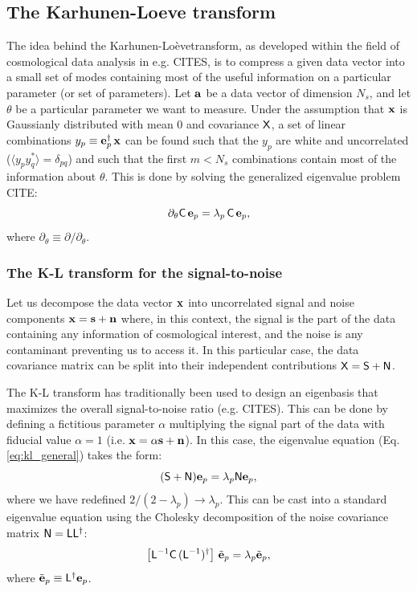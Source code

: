\documentclass[twocolumn,amsfont,amssymb,amsmath, showpacs,balancelastpage, nofootinbib]{revtex4-1}
\newcommand{\kalo}{Karhunen-Lo\`{e}ve}
\begin{document}
  \subsection{The Karhunen-Loeve transform}\label{ssec:method.klbasis}
    The idea behind the \kalo transform, as developed within the field of cosmological data analysis in e.g. CITES, is to compress a given data vector into a small set of modes containing most of the useful information on a particular parameter (or set of parameters). Let ${\bf a}$ be a data vector of dimension $N_s$, and let $\theta$ be a particular parameter we want to measure. Under the assumption that ${\bf x}$ is Gaussianly distributed with mean 0 and covariance ${\sf X}$, a set of linear combinations $y_p\equiv{\bf e}_p^\dag\,{\bf x}$ can be found such that the $y_p$ are white and uncorrelated ($\langle y_py_q^*\rangle=\delta_{pq}$) and such that the first $m<N_s$ combinations contain most of the information about $\theta$. This is done by solving the generalized eigenvalue problem CITE:
    \begin{equation}\label{eq:kl_general}
      \partial_\theta{\sf C}\,{\bf e}_p=\lambda_p\,{\sf C}\,{\bf e}_p,
    \end{equation}
    where $\partial_\theta\equiv\partial/\partial_\theta$.
    
    \subsubsection{The K-L transform for the signal-to-noise}\label{sssec:method.klbasis.sn}
      Let us decompose the data vector ${\bf x}$ into uncorrelated signal and noise components ${\bf x}={\bf s}+{\bf n}$ where, in this context, the signal is the part of the data containing any information of cosmological interest, and the noise is any contaminant preventing us to access it. In this particular case, the data covariance matrix can be split into their independent contributions ${\sf X}={\sf S}+{\sf N}$.
      
      The K-L transform has traditionally been used to design an eigenbasis that maximizes the overall signal-to-noise ratio (e.g. CITES). This can be done by defining a fictitious parameter $\alpha$ multiplying the signal part of the data with fiducial value $\alpha=1$ (i.e. ${\bf x}=\alpha{\bf s}+{\bf n}$). In this case, the eigenvalue equation (Eq. \ref{eq:kl_general}) takes the form:
      \begin{equation}\label{eq:kl_sn}
        ({\sf S}+{\sf N}){\bf e}_p=\lambda_p{\sf N}{\bf e}_p,
      \end{equation}
      where we have redefined $2/(2-\lambda_p)\rightarrow\lambda_p$. This can be cast into a standard eigenvalue equation using the Cholesky decomposition of the noise covariance matrix ${\sf N}={\sf L}{\sf L}^\dag$:
      \begin{equation}\label{eq:kl_sn_st}
        \left[{\sf L}^{-1}{\sf C}\,({\sf L}^{-1})^\dag\right]\,\tilde{\bf e}_p=\lambda_p\tilde{\bf e}_p,
      \end{equation}
      where $\tilde{\bf e}_p\equiv{\sf L}^\dag{\bf e}_p$.
      
\end{document}
